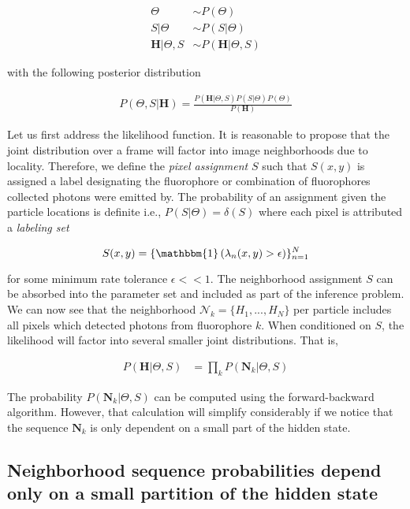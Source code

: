\documentclass{ucetd}
\begin{document}
\begin{align*}
\Theta &\sim P(\Theta)\\
S|\Theta &\sim P(S|\Theta)\\
\bm{H}|\Theta,S &\sim P(\bm{H}|\Theta,S)
\end{align*}

with the following posterior distribution

\begin{align*}
P(\Theta,S|\bm{H}) = \frac{P(\bm{H}|\Theta,S)P(S|\Theta)P(\Theta)}{P(\bm{H})}
\end{align*}

Let us first address the likelihood function. It is reasonable to propose that the joint distribution over a frame will factor into image neighborhoods due to locality. Therefore, we define the \emph{pixel assignment} $S$ such that $S(x,y)$ is assigned a label designating the fluorophore or combination of fluorophores collected photons were emitted by. The probability of an assignment given the particle locations is definite i.e., $P(S|\Theta) = \delta(S)$ where each pixel is attributed a \emph{labeling set}

\begin{equation*}
S(x,y) =  \{\mathbbm{1}\left(\lambda_{n}(x,y) > \epsilon\right)\}_{n=1}^{N}
\end{equation*}
 
for some minimum rate tolerance $\epsilon << 1$. The neighborhood assignment $S$ can be absorbed into the parameter set and included as part of the inference problem. We can now see that the neighborhood $\mathcal{N}_{k} = \{H_{1},...,H_{N}\}$ per particle includes all pixels which detected photons from fluorophore $k$. When conditioned on $S$, the likelihood will factor into several smaller joint distributions. That is,

\begin{align*}
P(\bm{H}|\Theta,S) &= \prod_{k}P(\bm{N}_{k}|\Theta,S)
\end{align*}

The probability $P(\bm{N}_{k}|\Theta,S)$ can be computed using the forward-backward algorithm. However, that calculation will simplify considerably if we notice that the sequence $\bm{N}_{k}$ is only dependent on a small part of the hidden state.

\subsection{Neighborhood sequence probabilities depend only on a small partition of the hidden state}
\end{document}
